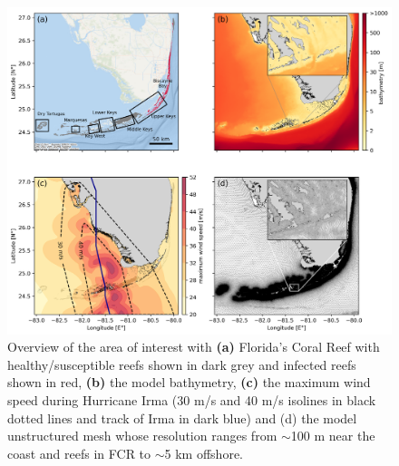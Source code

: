 \documentclass[fleqn,10pt]{wlscirep}
\begin{document}
\begin{figure}[tbp]
    \centering
    \includegraphics[width=.9\textwidth]{figures/fig_setup.png}
    \caption{Overview of the area of interest with \textbf{(a)} Florida's Coral Reef with healthy/susceptible reefs shown in dark grey and infected reefs shown in red, \textbf{(b)} the model bathymetry, \textbf{(c)} the maximum wind speed during Hurricane Irma (30 m/s and 40 m/s isolines in black dotted lines and track of Irma in dark blue) and (d) the model unstructured mesh whose resolution ranges from $\sim$100 m near the coast and reefs in FCR to $\sim$5 km offshore.}
    \label{fig:domain}
\end{figure}
\end{document}

